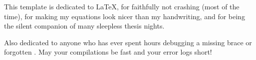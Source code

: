 
This template is dedicated to \LaTeX,  
for faithfully not crashing (most of the time),  
for making my equations look nicer than my handwriting,  
and for being the silent companion of many sleepless thesis nights.  

Also dedicated to anyone who has ever spent hours debugging a missing brace or forgotten \verb||.  
May your compilations be fast and your error logs short!